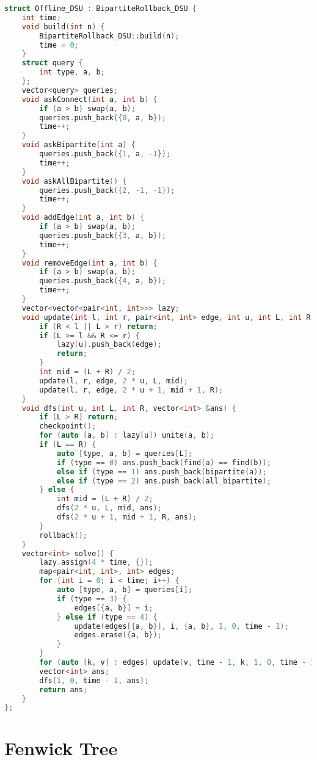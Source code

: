 \documentclass[10pt, a4paper, oneside]{book}
\begin{document}
\begin{lstlisting}[language=C++]
struct Offline_DSU : BipartiteRollback_DSU {
    int time;
    void build(int n) {
        BipartiteRollback_DSU::build(n);
        time = 0;
    }
    struct query {
        int type, a, b;
    };
    vector<query> queries;
    void askConnect(int a, int b) {
        if (a > b) swap(a, b);
        queries.push_back({0, a, b});
        time++;
    }
    void askBipartite(int a) {
        queries.push_back({1, a, -1});
        time++;
    }
    void askAllBipartite() {
        queries.push_back({2, -1, -1});
        time++;
    }
    void addEdge(int a, int b) {
        if (a > b) swap(a, b);
        queries.push_back({3, a, b});
        time++;
    }
    void removeEdge(int a, int b) {
        if (a > b) swap(a, b);
        queries.push_back({4, a, b});
        time++;
    }
    vector<vector<pair<int, int>>> lazy;
    void update(int l, int r, pair<int, int> edge, int u, int L, int R) {
        if (R < l || L > r) return;
        if (L >= l && R <= r) {
            lazy[u].push_back(edge);
            return;
        }
        int mid = (L + R) / 2;
        update(l, r, edge, 2 * u, L, mid);
        update(l, r, edge, 2 * u + 1, mid + 1, R);
    }
    void dfs(int u, int L, int R, vector<int> &ans) {
        if (L > R) return;
        checkpoint();
        for (auto [a, b] : lazy[u]) unite(a, b);
        if (L == R) {
            auto [type, a, b] = queries[L];
            if (type == 0) ans.push_back(find(a) == find(b));
            else if (type == 1) ans.push_back(bipartite(a));
            else if (type == 2) ans.push_back(all_bipartite);
        } else {
            int mid = (L + R) / 2;
            dfs(2 * u, L, mid, ans);
            dfs(2 * u + 1, mid + 1, R, ans);
        }
        rollback();
    }
    vector<int> solve() {
        lazy.assign(4 * time, {});
        map<pair<int, int>, int> edges;
        for (int i = 0; i < time; i++) {
            auto [type, a, b] = queries[i];
            if (type == 3) {
                edges[{a, b}] = i;
            } else if (type == 4) {
                update(edges[{a, b}], i, {a, b}, 1, 0, time - 1);
                edges.erase({a, b});
            }
        }
        for (auto [k, v] : edges) update(v, time - 1, k, 1, 0, time - 1);
        vector<int> ans;
        dfs(1, 0, time - 1, ans);
        return ans;
    }
};\end{lstlisting}
\hfill

\section{Fenwick Tree}
\end{document}
